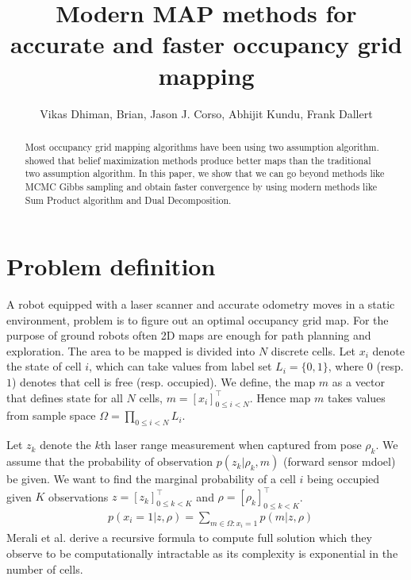 \documentclass[letterpaper, 10 pt, conference]{ieeeconf} %
\title{Modern MAP methods for accurate and faster occupancy grid mapping}
\author{Vikas Dhiman, Brian, Jason J. Corso, Abhijit Kundu, Frank Dallert}
\begin{document}
\maketitle
\begin{abstract}
  Most occupancy grid mapping algorithms have been using two assumption
  algorithm.  \cite{merali2013icra} showed that belief maximization methods
  produce better maps than the traditional two assumption algorithm.  In this
  paper, we show that we can go beyond methods like MCMC Gibbs sampling and
  obtain faster convergence by using modern methods like Sum Product algorithm
  and Dual Decomposition.
\end{abstract}
\section{Problem definition}
A robot equipped with a laser scanner and accurate odometry moves in a static
environment, problem is to figure out an optimal occupancy grid map. For the
purpose of ground robots often 2D maps are enough for path planning and
exploration. 
The area to be mapped is divided into $N$ discrete cells. Let $x_i$ denote the state of cell $i$, which can take values from label set $L_i = \{0, 1\}$, where $0$ (resp. $1$) denotes that cell is free (resp. occupied). We define, the map $m$ as a vector that defines state for all $N$ cells, $m = [x_i]^\top_{0 \le i < N}$. Hence map $m$ takes values from sample space $\Omega = \prod_{0 \le i < N}L_i$.

Let $z_k$ denote the $k$th laser range measurement when captured from pose $\rho_k$. We assume that the probability of observation $p(z_k| \rho_k, m)$ (forward sensor mdoel) be given. We want to find the marginal probability of a cell $i$ being occupied given $K$ observations $z = [z_k]^\top_{0 \le k < K}$ and $\rho = [\rho_k]^\top_{0 \le k < K}$.
\begin{align}
  &p(x_i = 1 | z, \rho) = \sum_{m \in \Omega : x_i = 1} p(m | z , \rho)
  \label{eq:fullsolution}
\end{align}
Merali et al. \cite{merali2013icra} derive a recursive formula to compute full solution which they observe
to be computationally intractable as its complexity is exponential in the number of cells.
\end{document}
